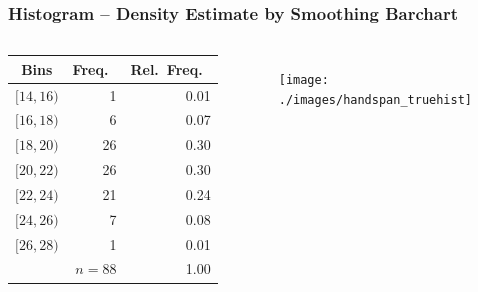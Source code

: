 \begin{frame}
\frametitle{Histogram -- Density Estimate by Smoothing Barchart}
\footnotesize
\singlespacing

\begin{columns}
\begin{tabular}{crr}
Bins & Freq.\ & Rel.\ Freq.\ \\
\hline
 $[14,16)$&1& 0.01\\
 $[16,18)$&6& 0.07\\
 $[18,20)$&26&0.30 \\
 $[20,22)$&26&0.30 \\
 $[22,24)$&21&0.24 \\
 $[24,26)$&7&0.08 \\
 $[26,28)$&1&0.01\\
 \hline
 & $n=88$&1.00
\end{tabular}
\begin{figure}
	\centering
	\texttt{[image: ./images/handspan\_truehist]}
\end{figure}
\end{columns}
\end{frame}

